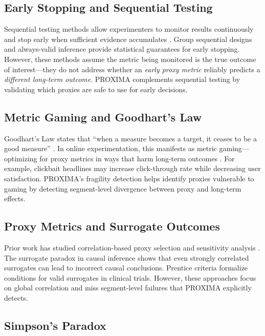 \documentclass[11pt,twocolumn]{article}
\begin{document}
\subsection{Early Stopping and Sequential Testing}

Sequential testing methods allow experimenters to monitor results continuously and stop early when sufficient evidence accumulates \cite{johari2017peeking}. Group sequential designs \cite{jennison1999group} and always-valid inference \cite{howard2021time} provide statistical guarantees for early stopping. However, these methods assume the metric being monitored is the true outcome of interest—they do not address whether an \textit{early proxy metric} reliably predicts a \textit{different long-term outcome}. PROXIMA complements sequential testing by validating which proxies are safe to use for early decisions.

\subsection{Metric Gaming and Goodhart's Law}

Goodhart's Law states that ``when a measure becomes a target, it ceases to be a good measure'' \cite{goodhart1984problems}. In online experimentation, this manifests as metric gaming—optimizing for proxy metrics in ways that harm long-term outcomes \cite{liu2019understanding}. For example, clickbait headlines may increase click-through rate while decreasing user satisfaction. PROXIMA's fragility detection helps identify proxies vulnerable to gaming by detecting segment-level divergence between proxy and long-term effects.

\subsection{Proxy Metrics and Surrogate Outcomes}

Prior work has studied correlation-based proxy selection \cite{deng2013improving} and sensitivity analysis \cite{deng2017statistical}. The surrogate paradox in causal inference \cite{chen2007criteria} shows that even strongly correlated surrogates can lead to incorrect causal conclusions. Prentice criteria \cite{prentice1989surrogate} formalize conditions for valid surrogates in clinical trials. However, these approaches focus on global correlation and miss segment-level failures that PROXIMA explicitly detects.

\subsection{Simpson's Paradox}
\end{document}
